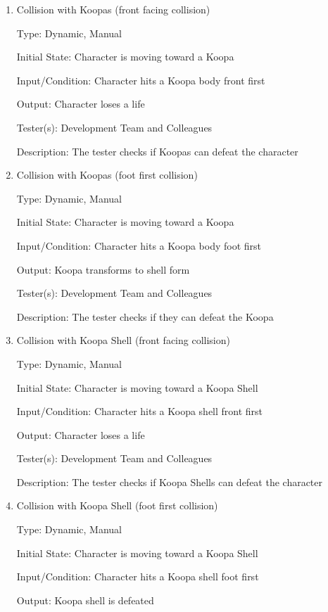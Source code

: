 \documentclass[12pt, titlepage]{article}
\begin{document}
\begin{enumerate}
\item{Collision with Koopas (front facing collision)\\}

Type: Dynamic, Manual

Initial State: Character is moving toward a Koopa

Input/Condition: Character hits a Koopa body front first

Output: Character loses a life

Tester(s): Development Team and Colleagues

Description: The tester checks if Koopas can defeat the character


\item{Collision with Koopas (foot first collision)\\}

Type: Dynamic, Manual

Initial State: Character is moving toward a Koopa

Input/Condition: Character hits a Koopa body foot first

Output: Koopa transforms to shell form

Tester(s): Development Team and Colleagues

Description: The tester checks if they can defeat the Koopa


\item{Collision with Koopa Shell (front facing collision)\\}

Type: Dynamic, Manual

Initial State: Character is moving toward a Koopa Shell

Input/Condition: Character hits a Koopa shell front first

Output: Character loses a life

Tester(s): Development Team and Colleagues

Description: The tester checks if Koopa Shells can defeat the character


\item{Collision with Koopa Shell (foot first collision)\\}

Type: Dynamic, Manual

Initial State: Character is moving toward a Koopa Shell

Input/Condition: Character hits a Koopa shell foot first

Output: Koopa shell is defeated


\end{enumerate}
\end{document}
